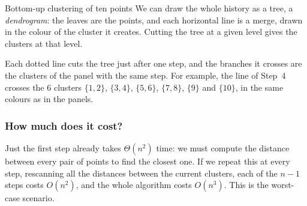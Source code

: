 \documentclass[a4paper,12pt,oneside]{report}
\begin{document}
{\begin{framedexample}{Bottom-up clustering of ten points}
We can draw the whole history as a tree, a \emph{dendrogram}: the
leaves are the points, and each horizontal line is a merge, drawn in
the colour of the cluster it creates. Cutting the tree at a given level
gives the clusters at that level.
\begin{center}
\end{center}
Each dotted line cuts the tree just after one step, and the branches
it crosses are the clusters of the panel with the same step. For
example, the line of Step~4 crosses the $6$ clusters $\{1,2\}$,
$\{3,4\}$, $\{5,6\}$, $\{7,8\}$, $\{9\}$ and $\{10\}$, in the same
colours as in the panels.
\end{framedexample}}

\subsubsection{How much does it cost?}

Just the first step already takes $\Theta(n^2)$ time: we must
compute the distance between every pair of points to find the closest
one. If we repeat this at every step, rescanning all the distances
between the current clusters, each of the $n-1$ steps costs $O(n^2)$,
and the whole algorithm costs $O(n^3)$. This is the worst-case
scenario.
\end{document}
